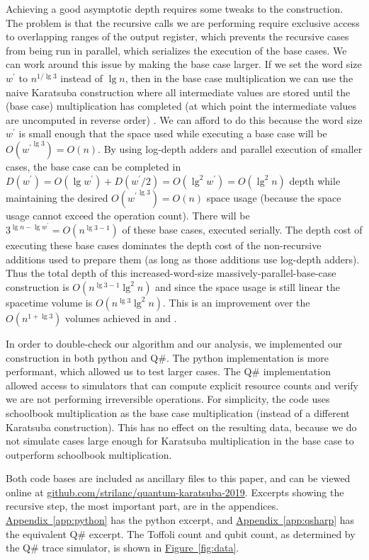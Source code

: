 \documentclass[onecolumn]{quantumarticle}
\DeclareRobustCommand{\app}[1]{\hyperref[app:#1]{Appendix~\ref*{app:#1}}}
\newcommand{\fig}[1]{\hyperref[fig:#1]{Figure~\ref*{fig:#1}}}
\begin{document}
Achieving a good asymptotic depth requires some tweaks to the construction.
The problem is that the recursive calls we are performing require exclusive access to overlapping ranges of the output register, which prevents the recursive cases from being run in parallel, which serializes the execution of the base cases.
We can work around this issue by making the base case larger.
If we set the word size $w^\prime$ to $n^{1 / \lg 3}$ instead of $\lg n$, then in the base case multiplication we can use the naive Karatsuba construction where all intermediate values are stored until the (base case) multiplication has completed (at which point the intermediate values are uncomputed in reverse order) \cite{bennett1973logical}.
We can afford to do this because the word size $w^\prime$ is small enough that the space used while executing a base case will be $O({w^\prime}^{\lg 3}) = O(n)$.
By using log-depth adders and parallel execution of smaller cases, the base case can be completed in $D(w^\prime) = O(\lg w^\prime) + D(w^\prime/2) = O(\lg^2 w^\prime) = O(\lg^2 n)$ depth while maintaining the desired $O({w^\prime}^{\lg 3}) = O(n)$ space usage (because the space usage cannot exceed the operation count).
There will be $3^{\lg n - \lg w^\prime} = O(n^{\lg 3 - 1})$ of these base cases, executed serially.
The depth cost of executing these base cases dominates the depth cost of the non-recursive additions used to prepare them (as long as those additions use log-depth adders).
Thus the total depth of this increased-word-size massively-parallel-base-case construction is $O(n^{\lg 3 - 1} \lg^2 n)$ and since the space usage is still linear the spacetime volume is $O(n^{\lg 3} \lg^2 n)$.
This is an improvement over the $O(n^{1 + \lg 3})$ volumes achieved in \cite{portugal2006karatsuba} and \cite{parent2017karatsuba}.

In order to double-check our algorithm and our analysis, we implemented our construction in both python and Q\#.
The python implementation is more performant, which allowed us to test larger cases.
The Q\# implementation allowed access to simulators that can compute explicit resource counts and verify we are not performing irreversible operations.
For simplicity, the code uses schoolbook multiplication as the base case multiplication (instead of a different Karatsuba construction).
This has no effect on the resulting data, because we do not simulate cases large enough for Karatsuba multiplication in the base case to outperform schoolbook multiplication.

Both code bases are included as ancillary files to this paper, and can be viewed online at \href{https://github.com/strilanc/quantum-karatsuba-2019}{github.com/strilanc/quantum-karatsuba-2019}.
Excerpts showing the recursive step, the most important part, are in the appendices.
\app{python} has the python excerpt, and \app{qsharp} has the equivalent Q\# excerpt.
The Toffoli count and qubit count, as determined by the Q\# trace simulator, is shown in \fig{data}.
\end{document}
